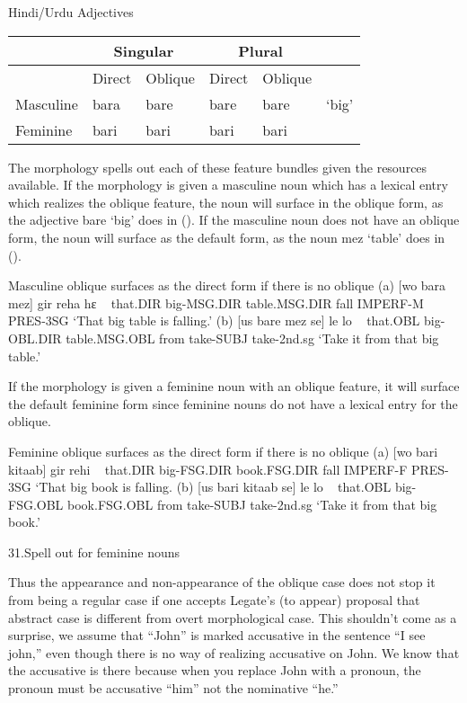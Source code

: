 \documentclass{article}
\let\ipa\textipa %
\begin{document}
\begin{example}Hindi/Urdu Adjectives\\
\begin{tabular}{|l|l|l|l|l|l|}\hline
& \multicolumn{2}{c|}{Singular} & \multicolumn{2}{c|}{Plural}  &\\\hline
& Direct & Oblique & Direct & Oblique &\\\hline\hline
Masculine & bara & bare & bare & bare & `big'\\
Feminine & bari & bari & bari & bari & \\\hline
\end{tabular}
\end{example}

The morphology spells out each of these feature bundles given the resources available. If the morphology is given a masculine noun which has a lexical entry which realizes the oblique feature, the noun will surface in the oblique form, as the adjective bare `big' does in (). If the masculine noun does not have an oblique form, the noun will surface as the default form, as the noun mez `table' does in ().

\begin{example}Masculine oblique surfaces as the direct form if there is no oblique
\gll(a) [wo   bara   mez]   gir  reha   hɛ
~ that.DIR big-MSG.DIR  table.MSG.DIR  fall IMPERF-M  PRES-3SG
\glt `That big table is falling.'
\glend
\gll (b) [us   bare   mez   se]  le   lo
~ that.OBL  big-OBL.DIR  table.MSG.OBL  from  take-SUBJ take-2nd.sg
\glt `Take it from that big table.'
\glend
\end{example}

If the morphology is given a feminine noun with an oblique feature, it will surface the default feminine form since feminine nouns do not have a lexical entry for the oblique.

\begin{example}Feminine oblique surfaces as the direct form if there is no oblique
\gll (a) [wo   bari   kitaab]  gir rehi  \ipa{hE}
~ that.DIR  big-FSG.DIR  book.FSG.DIR  fall IMPERF-F  PRES-3SG
\glt`That big book is falling.
\glend
\gll (b) [us   bari   kitaab   se]  le   lo
~ that.OBL  big-FSG.OBL  book.FSG.OBL  from  take-SUBJ  take-2nd.sg
\glt `Take it from that big book.'
\glend
\end{example}
31.Spell out for feminine nouns


Thus the appearance and non-appearance of the oblique case does not stop it from being a regular case if one accepts Legate's (to appear) proposal that abstract case is different from overt morphological case. This shouldn't come as a surprise, we assume that ``John” is marked accusative in the sentence ``I see john,” even though there is no way of realizing accusative on John. We know that the accusative is there because when you replace John with a pronoun, the pronoun must be accusative ``him” not the nominative ``he.”
\end{document}
